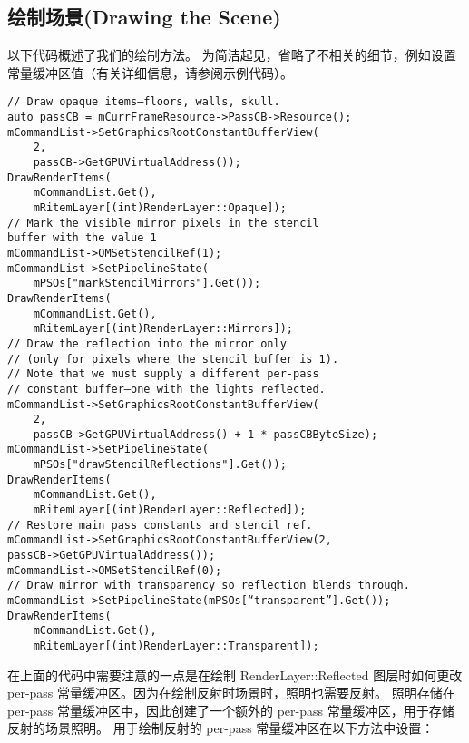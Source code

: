\subsection{绘制场景(Drawing the Scene)}
\begin{flushleft}
以下代码概述了我们的绘制方法。 为简洁起见，省略了不相关的细节，例如设置常量缓冲区值（有关详细信息，请参阅示例代码）。
\end{flushleft}
\begin{lstlisting}
// Draw opaque items—floors, walls, skull.
auto passCB = mCurrFrameResource->PassCB->Resource();
mCommandList->SetGraphicsRootConstantBufferView(
    2,
    passCB->GetGPUVirtualAddress());
DrawRenderItems(
    mCommandList.Get(),
    mRitemLayer[(int)RenderLayer::Opaque]);
// Mark the visible mirror pixels in the stencil
buffer with the value 1
mCommandList->OMSetStencilRef(1);
mCommandList->SetPipelineState(
    mPSOs["markStencilMirrors"].Get());
DrawRenderItems(
    mCommandList.Get(),
    mRitemLayer[(int)RenderLayer::Mirrors]);
// Draw the reflection into the mirror only 
// (only for pixels where the stencil buffer is 1).
// Note that we must supply a different per-pass 
// constant buffer—one with the lights reflected.
mCommandList->SetGraphicsRootConstantBufferView(
    2,
    passCB->GetGPUVirtualAddress() + 1 * passCBByteSize);
mCommandList->SetPipelineState(
    mPSOs["drawStencilReflections"].Get());
DrawRenderItems(
    mCommandList.Get(),
    mRitemLayer[(int)RenderLayer::Reflected]);
// Restore main pass constants and stencil ref.
mCommandList->SetGraphicsRootConstantBufferView(2,
passCB->GetGPUVirtualAddress());
mCommandList->OMSetStencilRef(0);
// Draw mirror with transparency so reflection blends through.
mCommandList->SetPipelineState(mPSOs[“transparent”].Get());
DrawRenderItems(
    mCommandList.Get(),
    mRitemLayer[(int)RenderLayer::Transparent]);
\end{lstlisting}

\begin{flushleft}
在上面的代码中需要注意的一点是在绘制 RenderLayer::Reflected 图层时如何更改 per-pass 常量缓冲区。因为在绘制反射时场景时，照明也需要反射。 照明存储在 per-pass 常量缓冲区中，因此创建了一个额外的 per-pass 常量缓冲区，用于存储反射的场景照明。 用于绘制反射的 per-pass 常量缓冲区在以下方法中设置：\\
\end{flushleft}

